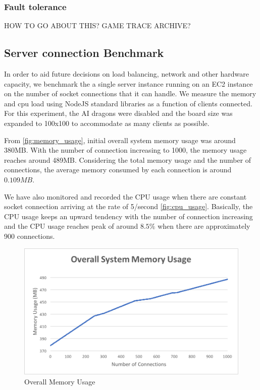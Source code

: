 \documentclass[a4paper]{IEEEtran}
\begin{document}
  \subsubsection{Fault tolerance}

  HOW TO GO ABOUT THIS? GAME TRACE ARCHIVE?

  \subsection{Server connection Benchmark}

  In order to aid future decisions on load balancing, network and other hardware capacity, we benchmark the a single server instance running on an EC2 instance on the number of socket connections that it can handle. We measure the memory and cpu load using NodeJS standard libraries as a function of clients connected. For this experiment, the AI dragons were disabled and the board size was expanded to 100x100 to accommodate as many clients as possible.
  
  From \autoref{fig:memory_usage}, initial overall system memory usage was around 380MB. With the number of connection increasing to 1000, the memory usage reaches around 489MB. Considering the total memory usage and the number of connections, the average memory consumed by each connection is around $0.109MB$.
  
  We have also monitored and recorded the CPU usage when there are constant socket connection arriving at the rate of 5/second \autoref{fig:cpu_usage}. Basically, the CPU usage keeps an upward tendency with the number of connection increasing and the CPU usage reaches peak of around $8.5\%$ when there are approximately 900 connections. 
  
    \begin{figure}[tbp]
    \centering
      \includegraphics[width=\columnwidth]{MemoryUsage.png}
    \caption{Overall Memory Usage}
    \label{fig:memory_usage}
  \end{figure}
  
\end{document}
